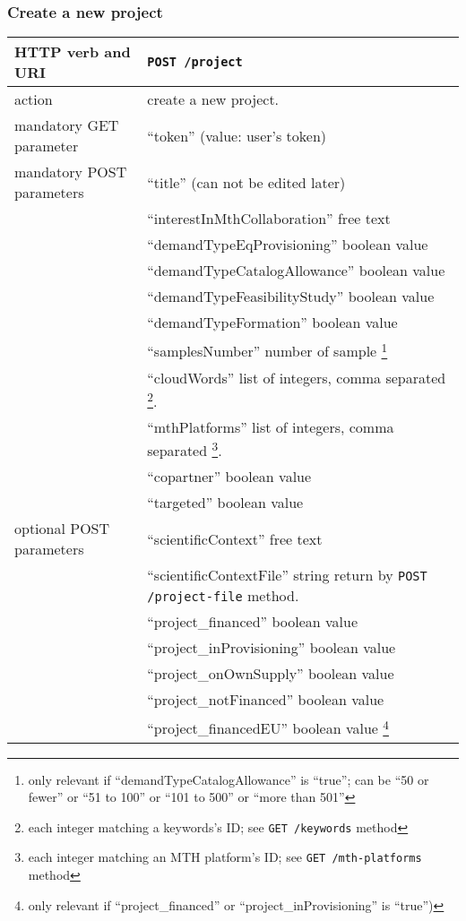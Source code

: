\subsubsection{Create a new project}
\begin{tabular}{ | l | l | }
	\hline
	HTTP verb and URI & \texttt{POST /project} \\
	\hline
	action & create a new project. \\
	\hline
	mandatory GET parameter & ``token'' (value: user's token) \\
	\hline
	mandatory POST parameters & ``title'' (can not be edited later) \\
	\space & ``interestInMthCollaboration'' free text \\		
	\space & ``demandTypeEqProvisioning'' boolean value \\
	\space & ``demandTypeCatalogAllowance'' boolean value \\
	\space & ``demandTypeFeasibilityStudy'' boolean value \\
	\space & ``demandTypeFormation'' boolean value \\
	\space & ``samplesNumber'' number of sample \footnote{only relevant if ``demandTypeCatalogAllowance'' is ``true''; can be ``50 or fewer'' or ``51 to 100'' or ``101 to 500'' or ``more than 501'' } \\
	\space & ``cloudWords'' list of integers, comma separated \footnote{each integer matching a keywords’s ID; see \texttt{GET /keywords} method}. \\
	\space & ``mthPlatforms'' list of integers, comma separated \footnote{each integer matching an MTH platform’s ID; see \texttt{GET /mth-platforms} method}. \\
	\space & ``copartner'' boolean value \\
	\space & ``targeted'' boolean value \\
	\hline
	optional POST parameters & ``scientificContext'' free text \\	
	\space & ``scientificContextFile'' string return by \texttt{POST /project-file} method. \\
	\space & ``project\_financed'' boolean value  \\
	\space & ``project\_inProvisioning'' boolean value \\
	\space & ``project\_onOwnSupply'' boolean value \\
	\space & ``project\_notFinanced'' boolean value \\
	\space & ``project\_financedEU'' boolean value \footnote{only relevant if ``project\_financed'' or ``project\_inProvisioning'' is ``true'')} \\

\end{tabular}
